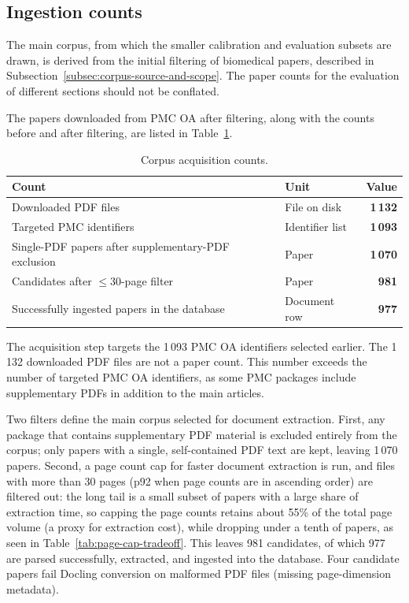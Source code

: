 \subsection{Ingestion counts}\label{subsec:ingestion-counts}

The main corpus, from which the smaller calibration and evaluation subsets are drawn, is derived from the initial filtering of biomedical papers, described in Subsection~\ref{subsec:corpus-source-and-scope}. The paper counts for the evaluation of different sections should not be conflated.

The papers downloaded from PMC OA after filtering, along with the counts before and after filtering, are listed in Table~\ref{tab:corpus-acquisition-counts}. 

\begin{table}[htpb]
  \caption[Corpus acquisition and filtering counts]{Corpus acquisition counts.}
  \label{tab:corpus-acquisition-counts}
  \centering
  \begin{tabular}{l l r}
    \toprule
      Count & Unit & Value \\
    \midrule
        Downloaded PDF files & File on disk & \textbf{1\,132} \\
        Targeted PMC identifiers & Identifier list & \textbf{1\,093} \\
        Single-PDF papers after supplementary-PDF exclusion & Paper & \textbf{1\,070} \\
        Candidates after \(\leq 30\)-page filter & Paper & \textbf{981} \\
        Successfully ingested papers in the database & Document row & \textbf{977} \\
    \bottomrule
  \end{tabular}
\end{table}

The acquisition step targets the 1\,093 PMC OA identifiers selected earlier. The 1\,132 downloaded PDF files are not a paper count. This number exceeds the number of targeted PMC OA identifiers, as some PMC packages include supplementary PDFs in addition to the main articles. 

Two filters define the main corpus selected for document extraction. First, any package that contains supplementary PDF material is excluded entirely from the corpus; only papers with a single, self-contained PDF text are kept, leaving 1\,070 papers. Second, a page count cap for faster document extraction is run, and files with more than 30 pages (p92 when page counts are in ascending order) are filtered out: the long tail is a small subset of papers with a large share of extraction time, so capping the page counts retains about 55\% of the total page volume (a proxy for extraction cost), while dropping under a tenth of papers, as seen in Table~\ref{tab:page-cap-tradeoff}. This leaves 981 candidates, of which 977 are parsed successfully, extracted, and ingested into the database. Four candidate papers fail Docling conversion on malformed PDF files (missing page-dimension metadata). 


